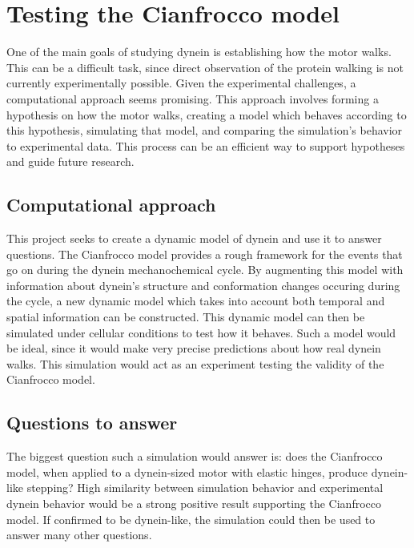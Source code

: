 \documentclass[
11pt, %
english, %
singlespacing, %
headsepline, %
chapterinoneline, %
]{MastersDoctoralThesis} %
\begin{document}


\section{Testing the Cianfrocco model}
One of the main goals of studying dynein is establishing how the motor walks. This can be a difficult task, since direct observation of the protein walking is not currently experimentally possible. Given the experimental challenges, a computational approach seems promising. This approach involves forming a hypothesis on how the motor walks, creating a model which behaves according to this hypothesis, simulating that model, and comparing the simulation's behavior to experimental data. This process can be an efficient way to support hypotheses and guide future research.\\

\subsection{Computational approach}
This project seeks to create a dynamic model of dynein and use it to answer questions. The Cianfrocco model provides a rough framework for the events that go on during the dynein mechanochemical cycle. By augmenting this model with information about dynein's structure and conformation changes occuring during the cycle, a new dynamic model which takes into account both temporal and spatial information can be constructed. This dynamic model can then be simulated under cellular conditions to test how it behaves. Such a model would be ideal, since it would make very precise predictions about how real dynein walks. This simulation would act as an experiment testing the validity of the Cianfrocco model.\\

\subsection{Questions to answer}
The biggest question such a simulation would answer is: does the Cianfrocco model, when applied to a dynein-sized motor with elastic hinges, produce dynein-like stepping? High similarity between simulation behavior and experimental dynein behavior would be a strong positive result supporting the Cianfrocco model. If confirmed to be dynein-like, the simulation could then be used to answer many other questions.\\
\end{document}
